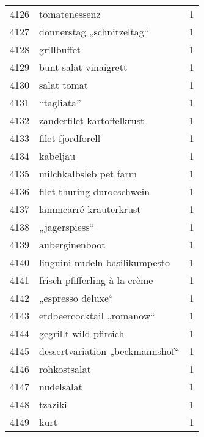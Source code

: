 \begin{tabular}{llr}
4126 &                                      tomatenessenz &      1 \\
4127 &                          donnerstag „schnitzeltag“ &      1 \\
4128 &                                        grillbuffet &      1 \\
4129 &                              bunt salat vinaigrett &      1 \\
4130 &                                        salat tomat &      1 \\
4131 &                                         “tagliata” &      1 \\
4132 &                         zanderfilet kartoffelkrust &      1 \\
4133 &                                  filet fjordforell &      1 \\
4134 &                                           kabeljau &      1 \\
4135 &                             milchkalbsleb pet farm &      1 \\
4136 &                         filet thuring durocschwein &      1 \\
4137 &                             lammcarré krauterkrust &      1 \\
4138 &                                      „jagerspiess“ &      1 \\
4139 &                                     auberginenboot &      1 \\
4140 &                     linguini nudeln basilikumpesto &      1 \\
4141 &                      frisch pfifferling à la crème &      1 \\
4142 &                                  „espresso deluxe“ &      1 \\
4143 &                          erdbeercocktail „romanow“ &      1 \\
4144 &                             gegrillt wild pfirsich &      1 \\
4145 &                    dessertvariation „beckmannshof“ &      1 \\
4146 &                                       rohkostsalat &      1 \\
4147 &                                         nudelsalat &      1 \\
4148 &                                            tzaziki &      1 \\
4149 &                                               kurt &      1 \\

\end{tabular}
